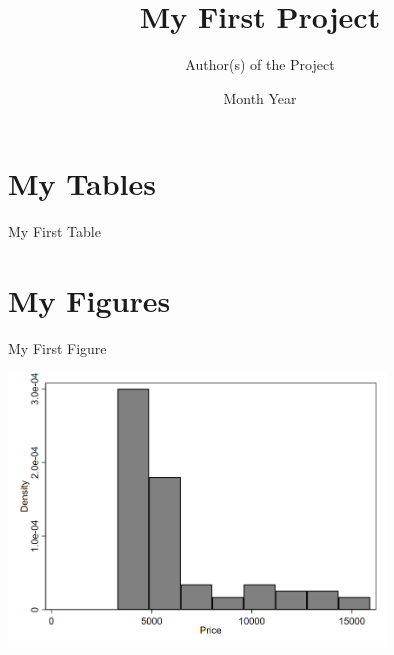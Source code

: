\documentclass{article}
\title{My First Project}
\author{Author(s) of the Project}
\date{Month Year}
\begin{document}
\maketitle


\section{My Tables}
\begin{table}[!ht]
\label{myfirsttable}
\caption{My First Table}
\centering

\end{table}

\section{My Figures}
\begin{table}[!ht]
\label{myfirstfigure}
\caption{My First Figure}
\centering
\includegraphics[width=0.75\textwidth]{../output/figures/myfirstfigure.png}
\end{table}
\end{document}
